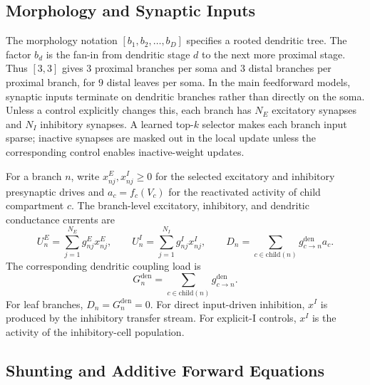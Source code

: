     \subsection{Morphology and Synaptic Inputs}
    
    The morphology notation $[b_1,b_2,\dots,b_D]$ specifies a rooted dendritic tree. The factor $b_d$ is the fan-in from dendritic stage $d$ to the next more proximal stage. Thus $[3,3]$ gives $3$ proximal branches per soma and $3$ distal branches per proximal branch, for $9$ distal leaves per soma. In the main feedforward models, synaptic inputs terminate on dendritic branches rather than directly on the soma. Unless a control explicitly changes this, each branch has $N_E$ excitatory synapses and $N_I$ inhibitory synapses. A learned top-$k$ selector makes each branch input sparse; inactive synapses are masked out in the local update unless the corresponding control enables inactive-weight updates.
    
    For a branch $n$, write $x_{nj}^E,x_{nj}^I\geq 0$ for the selected excitatory and inhibitory presynaptic drives and $a_c=f_c(V_c)$ for the reactivated activity of child compartment $c$. The branch-level excitatory, inhibitory, and dendritic conductance currents are
    \[
    U_n^E=\sum_{j=1}^{N_E} g_{nj}^E x_{nj}^E,
    \qquad
    U_n^I=\sum_{j=1}^{N_I} g_{nj}^I x_{nj}^I,
    \qquad
    D_n=\sum_{c\in\mathrm{child}(n)} g_{c\to n}^{\mathrm{den}} a_c .
    \]
    The corresponding dendritic coupling load is
    \[
    G_n^{\mathrm{den}}=\sum_{c\in\mathrm{child}(n)} g_{c\to n}^{\mathrm{den}}.
    \]
    For leaf branches, $D_n=G_n^{\mathrm{den}}=0$. For direct input-driven inhibition, $x^I$ is produced by the inhibitory transfer stream. For explicit-I controls, $x^I$ is the activity of the inhibitory-cell population.
    
    \subsection{Shunting and Additive Forward Equations}
    
